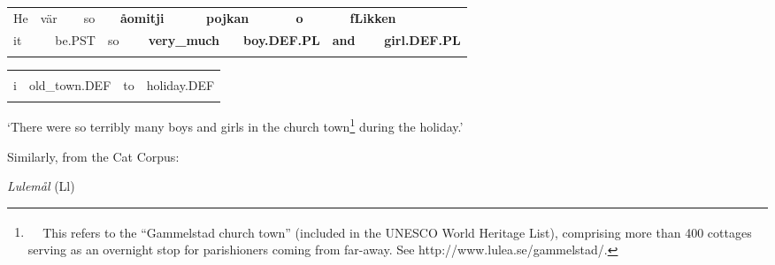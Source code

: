\begin{tabular}{llllllllllllll}
\lsptoprule
He & \multicolumn{2}{l}{vär

} & \multicolumn{2}{l}{so

} & \multicolumn{2}{l}{{\bfseries åomitji}

} & \multicolumn{2}{l}{{\bfseries pojkan}

} & \multicolumn{2}{l}{{\bfseries o}

} & \multicolumn{2}{l}{{\bfseries fLikken}

} & \\
\multicolumn{2}{l}{it

} & \multicolumn{2}{l}{be.PST

} & \multicolumn{2}{l}{so

} & \multicolumn{2}{l}{{\bfseries very\_much}

} & \multicolumn{2}{l}{{\bfseries boy.DEF.PL}

} & \multicolumn{2}{l}{{\bfseries and}

} & \multicolumn{2}{l}{{\bfseries girl.DEF.PL}

}\\
\lspbottomrule
\end{tabular}

\begin{tabular}{llll}
\lsptoprule
\multicolumn{4}{l}{ini

}\\
i & old\_town.DEF & to & holiday.DEF\\
\lspbottomrule
\end{tabular}

\begin{styleTranslation}
‘There were so terribly many boys and girls in the church town\footnote{\textsuperscript{\ \ } This refers to the “Gammelstad church town” (included in the UNESCO World Heritage List), comprising more than 400 cottages serving as an overnight stop for parishioners coming from far-away. See http://www.lulea.se/gammelstad/.} during the holiday.’

\end{styleTranslation}

\begin{styleBodyTextFirst}
Similarly, from the Cat Corpus:

\end{styleBodyTextFirst}

\begin{listWWNumileveli}
\item 

\begin{styleExample}
\textit{Lulemål }(Ll) 

\end{styleExample}

\end{listWWNumileveli}

